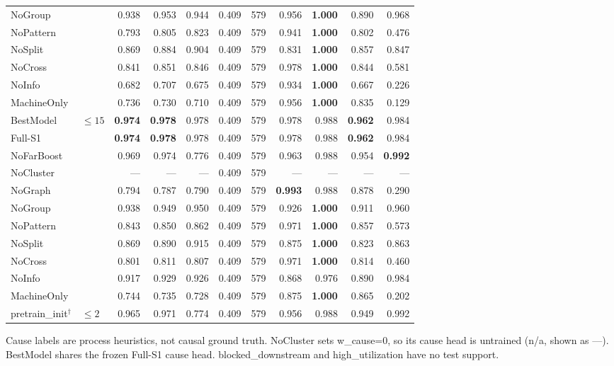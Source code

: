 \documentclass[9pt,a4paper,twocolumn]{extarticle}
\begin{document}
\begin{table}[tp]
\begin{tabular}{llrrrrrrrrr}
NoGroup &  & 0.938 & 0.953 & 0.944 & 0.409 & 579 & 0.956 & \textbf{1.000} & 0.890 & 0.968 \\
NoPattern &  & 0.793 & 0.805 & 0.823 & 0.409 & 579 & 0.941 & \textbf{1.000} & 0.802 & 0.476 \\
NoSplit &  & 0.869 & 0.884 & 0.904 & 0.409 & 579 & 0.831 & \textbf{1.000} & 0.857 & 0.847 \\
NoCross &  & 0.841 & 0.851 & 0.846 & 0.409 & 579 & 0.978 & \textbf{1.000} & 0.844 & 0.581 \\
NoInfo &  & 0.682 & 0.707 & 0.675 & 0.409 & 579 & 0.934 & \textbf{1.000} & 0.667 & 0.226 \\
MachineOnly &  & 0.736 & 0.730 & 0.710 & 0.409 & 579 & 0.956 & \textbf{1.000} & 0.835 & 0.129 \\
\midrule
BestModel & $\le 15$ & \textbf{0.974} & \textbf{0.978} & 0.978 & 0.409 & 579 & 0.978 & 0.988 & \textbf{0.962} & 0.984 \\
Full-S1 &  & \textbf{0.974} & \textbf{0.978} & 0.978 & 0.409 & 579 & 0.978 & 0.988 & \textbf{0.962} & 0.984 \\
NoFarBoost &  & 0.969 & 0.974 & 0.776 & 0.409 & 579 & 0.963 & 0.988 & 0.954 & \textbf{0.992} \\
NoCluster &  & --- & --- & --- & 0.409 & 579 & --- & --- & --- & --- \\
NoGraph &  & 0.794 & 0.787 & 0.790 & 0.409 & 579 & \textbf{0.993} & 0.988 & 0.878 & 0.290 \\
NoGroup &  & 0.938 & 0.949 & 0.950 & 0.409 & 579 & 0.926 & \textbf{1.000} & 0.911 & 0.960 \\
NoPattern &  & 0.843 & 0.850 & 0.862 & 0.409 & 579 & 0.971 & \textbf{1.000} & 0.857 & 0.573 \\
NoSplit &  & 0.869 & 0.890 & 0.915 & 0.409 & 579 & 0.875 & \textbf{1.000} & 0.823 & 0.863 \\
NoCross &  & 0.801 & 0.811 & 0.807 & 0.409 & 579 & 0.971 & \textbf{1.000} & 0.814 & 0.460 \\
NoInfo &  & 0.917 & 0.929 & 0.926 & 0.409 & 579 & 0.868 & 0.976 & 0.890 & 0.984 \\
MachineOnly &  & 0.744 & 0.735 & 0.728 & 0.409 & 579 & 0.875 & \textbf{1.000} & 0.865 & 0.202 \\
\midrule
pretrain\_init$^\dagger$ & $\le 2$ & 0.965 & 0.971 & 0.774 & 0.409 & 579 & 0.956 & 0.988 & 0.949 & 0.992 \\
\bottomrule
\end{tabular}
\par\smallskip\parbox{\textwidth}{\scriptsize Cause labels are process heuristics, not causal ground truth. NoCluster sets w\_cause=0, so its cause head is untrained (n/a, shown as ---). BestModel shares the frozen Full-S1 cause head. blocked\_downstream and high\_utilization have no test support.}
\end{table}
\end{document}
